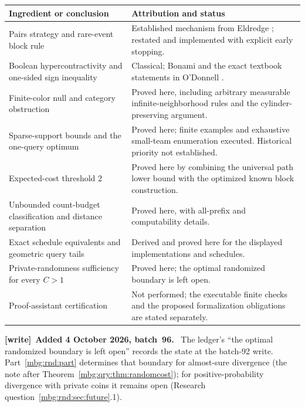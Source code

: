\documentclass[11pt,letterpaper]{article}
\theoremstyle{definition}
\newenvironment{writenote}[1][]{\par\smallskip\begingroup\small
 \noindent\textbf{[write]}\if\relax\detokenize{#1}\relax\else~\textbf{#1.}\fi\ }%
 {\par\endgroup\smallskip}
\begin{document}
\begin{longtable}{>{\raggedright\arraybackslash}p{}
 >{\raggedright\arraybackslash}p{}}
\toprule
Ingredient or conclusion&Attribution and status\\
\midrule
\endhead
Pairs strategy and rare-event block rule&
Established mechanism from Eldredge \cite{hat:Eldredge}; restated and
implemented with explicit early stopping.\\
\addlinespace
Boolean hypercontractivity and one-sided sign inequality&
Classical; Bonami and the exact textbook statements in O'Donnell
\cite{qry:Bonami,qry:ODonnell}.\\
\addlinespace
Finite-color null and category obstruction&
Proved here, including arbitrary measurable infinite-neighborhood rules
and the cylinder-preserving argument.\\
\addlinespace
Sparse-support bounds and the one-query optimum&
Proved here; finite examples and exhaustive small-team enumeration
executed. Historical priority not established.\\
\addlinespace
Expected-cost threshold \(2\)&
Proved here by combining the universal path lower bound with the
optimized known block construction.\\
\addlinespace
Unbounded count-budget classification and distance separation&
Proved here, with all-prefix and computability details.\\
\addlinespace
Exact schedule equivalents and geometric query tails&
Derived and proved here for the displayed implementations and schedules.\\
\addlinespace
Private-randomness sufficiency for every \(C>1\)&
Proved here; the optimal randomized boundary is left open.\\
\addlinespace
Proof-assistant certification&
Not performed; the executable finite checks and the proposed
formalization obligations are stated separately.\\
\bottomrule
\end{longtable}

\begin{writenote}[Added 4 October 2026, batch~96]
The ledger's ``the optimal randomized boundary is left open'' records the state at the batch-92 write. Part~\ref{mbg:rnd:part} determines that boundary for almost-sure divergence (the note after Theorem~\ref{mbg:qry:thm:randomcost}); for positive-probability divergence with private coins it remains open (Research question~\ref{mbg:rnd:sec:future}.1).
\end{writenote}
\end{document}
